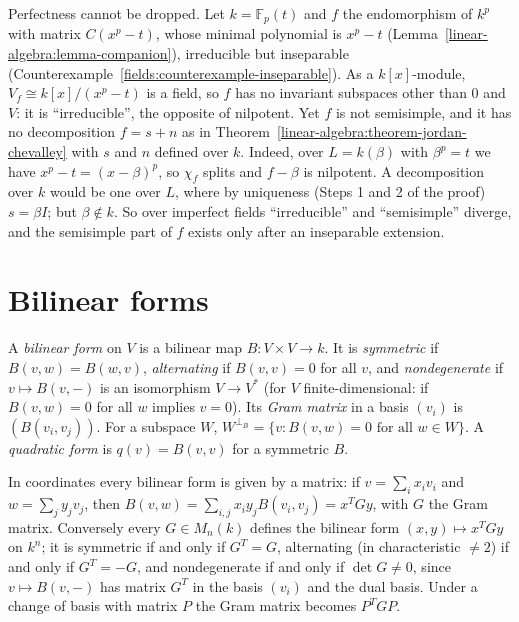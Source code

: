 \begin{counterexample}\label{linear-algebra:counterexample-jordan-chevalley-imperfect}
Perfectness cannot be dropped. Let $k = \mathbb{F}_p(t)$ and $f$ the endomorphism of $k^p$ with
matrix $C(x^p - t)$, whose minimal polynomial is $x^p - t$ (Lemma~\ref{linear-algebra:lemma-companion}),
irreducible but inseparable (Counterexample~\ref{fields:counterexample-inseparable}). As a
$k[x]$-module, $V_f \cong k[x]/(x^p - t)$ is a field, so $f$ has no invariant subspaces other than $0$
and $V$: it is ``irreducible'', the opposite of nilpotent. Yet $f$ is not semisimple, and it has no
decomposition $f = s + n$ as in Theorem~\ref{linear-algebra:theorem-jordan-chevalley} with $s$ and $n$
defined over $k$. Indeed, over $L = k(\beta)$ with $\beta^p = t$ we have $x^p - t = (x - \beta)^p$, so
$\chi_f$ splits and $f - \beta$ is nilpotent. A decomposition over $k$ would be one over $L$, where
by uniqueness (Steps 1 and 2 of the proof) $s = \beta I$; but $\beta \notin k$. So over imperfect
fields ``irreducible'' and ``semisimple'' diverge, and the semisimple part of $f$ exists only after
an inseparable extension.
\end{counterexample}

\section{Bilinear forms}\label{linear-algebra:section-bilinear}

\begin{definition}\label{linear-algebra:definition-bilinear-form}
A \emph{bilinear form} on $V$ is a bilinear map $B \colon V \times V \to k$. It is \emph{symmetric} if
$B(v, w) = B(w, v)$, \emph{alternating} if $B(v, v) = 0$ for all $v$, and \emph{nondegenerate} if
$v \mapsto B(v, -)$ is an isomorphism $V \to V^*$ (for $V$ finite-dimensional: if $B(v, w) = 0$ for all $w$ implies
$v = 0$). Its \emph{Gram matrix} in a basis $(v_i)$ is $(B(v_i, v_j))$. For a subspace $W$,
$W^{\perp_B} = \{v : B(v, w) = 0 \text{ for all } w \in W\}$. A \emph{quadratic form} is $q(v) = B(v, v)$ for
a symmetric $B$.
\end{definition}

In coordinates every bilinear form is given by a matrix: if $v = \sum_ix_iv_i$ and $w = \sum_jy_jv_j$, then $B(v, w) = \sum_{i,j}x_iy_jB(v_i, v_j) = x^TGy$, with $G$ the Gram matrix. Conversely
every $G \in M_n(k)$ defines the bilinear form $(x, y) \mapsto x^TGy$ on $k^n$; it is symmetric if and only if $G^T = G$, alternating (in characteristic $\neq 2$) if and only if $G^T = -G$, and
nondegenerate if and only if $\det G \neq 0$, since $v \mapsto B(v, -)$ has matrix $G^T$ in the basis $(v_i)$ and the dual basis. Under a change of basis with matrix $P$ the Gram matrix becomes $P^TGP$.


